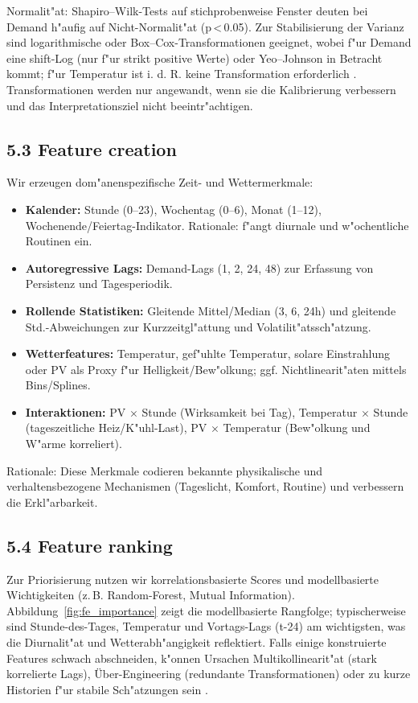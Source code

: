 \documentclass[12pt,a4paper]{article}
\begin{document}
Normalit{"a}t: Shapiro--Wilk-Tests auf stichprobenweise Fenster deuten bei Demand h{"a}ufig auf Nicht-Normalit{"a}t (p\,<\,0.05). Zur Stabilisierung der Varianz sind logarithmische oder Box--Cox-Transformationen geeignet, wobei f{"u}r Demand eine shift-Log (nur f{"u}r strikt positive Werte) oder Yeo--Johnson in Betracht kommt; f{"u}r Temperatur ist i. d. R. keine Transformation erforderlich \cite{Hyndman2021}. Transformationen werden nur angewandt, wenn sie die Kalibrierung verbessern und das Interpretationsziel nicht beeintr{"a}chtigen.

\subsection*{5.3 Feature creation}
Wir erzeugen dom{"a}nenspezifische Zeit- und Wettermerkmale:
\begin{itemize}[leftmargin=1.2em]
  \item \textbf{Kalender:} Stunde (0--23), Wochentag (0--6), Monat (1--12), Wochenende/Feiertag-Indikator. Rationale: f{"a}ngt diurnale und w{"o}chentliche Routinen ein.
  \item \textbf{Autoregressive Lags:} Demand-Lags (1, 2, 24, 48) zur Erfassung von Persistenz und Tagesperiodik.
  \item \textbf{Rollende Statistiken:} Gleitende Mittel/Median (3, 6, 24h) und gleitende Std.-Abweichungen zur Kurzzeitgl{"a}ttung und Volatilit{"a}tssch{"a}tzung.
  \item \textbf{Wetterfeatures:} Temperatur, gef{"u}hlte Temperatur, solare Einstrahlung oder PV als Proxy f{"u}r Helligkeit/Bew{"o}lkung; ggf. Nichtlinearit{"a}ten mittels Bins/Splines.
  \item \textbf{Interaktionen:} PV $\times$ Stunde (Wirksamkeit bei Tag), Temperatur $\times$ Stunde (tageszeitliche Heiz/K{"u}hl-Last), PV $\times$ Temperatur (Bew{"o}lkung und W{"a}rme korreliert).
\end{itemize}
Rationale: Diese Merkmale codieren bekannte physikalische und verhaltensbezogene Mechanismen (Tageslicht, Komfort, Routine) und verbessern die Erkl{"a}rbarkeit.

\subsection*{5.4 Feature ranking}
Zur Priorisierung nutzen wir korrelationsbasierte Scores und modellbasierte Wichtigkeiten (z.\,B. Random-Forest, Mutual Information). Abbildung~\ref{fig:fe_importance} zeigt die modellbasierte Rangfolge; typischerweise sind Stunde-des-Tages, Temperatur und Vortags-Lags (t-24) am wichtigsten, was die Diurnalit{"a}t und Wetterabh{"a}ngigkeit reflektiert. Falls einige konstruierte Features schwach abschneiden, k{"o}nnen Ursachen Multikollinearit{"a}t (stark korrelierte Lags), {\"U}ber-Engineering (redundante Transformationen) oder zu kurze Historien f{"u}r stabile Sch{"a}tzungen sein \cite{Zheng2020}.
\end{document}
